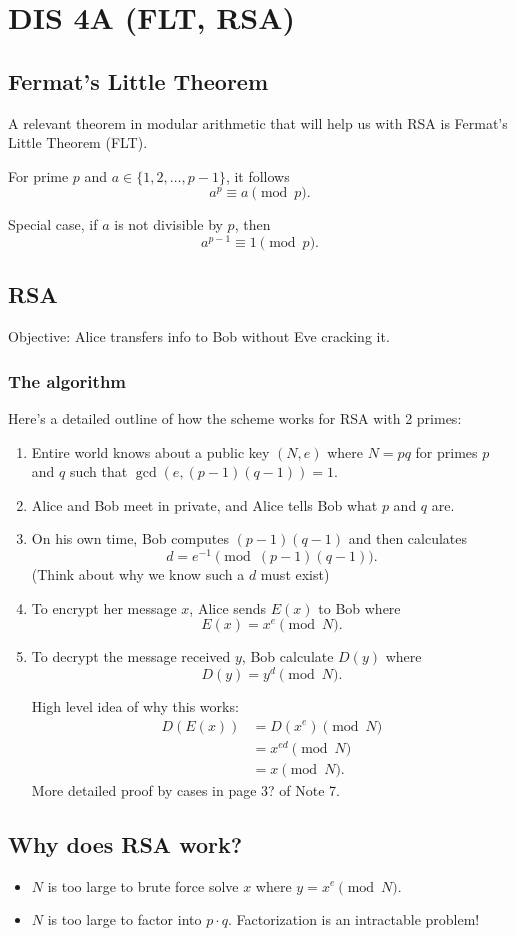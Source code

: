\section{DIS 4A (FLT, RSA)}

\subsection{Fermat's Little Theorem}

A relevant theorem in modular arithmetic that will help us with RSA is Fermat's Little Theorem (FLT).

\begin{theorem}
    For prime $p$ and $a \in \{1, 2, \ldots, p-1\}$, it follows \[ a^{p} \equiv a \pmod{p}. \]

    Special case, if $a$ is not divisible by $p$, then \[ a^{p-1} \equiv 1 \pmod{p}. \]
\end{theorem}

\subsection{RSA}
Objective: Alice transfers info to Bob without Eve cracking it. 
\subsubsection{The algorithm}
Here's a detailed outline of how the scheme works for RSA with 2 primes:
\begin{enumerate}
    \item Entire world knows about a public key $(N,e)$ where $N = pq$ for primes $p$ and $q$ such that $\gcd(e, (p-1)(q-1)) = 1.$
    \item Alice and Bob meet in private, and Alice tells Bob what $p$ and $q$ are.
    \item On his own time, Bob computes $(p-1)(q-1)$ and then calculates \[ d = e^{-1} \pmod{(p-1)(q-1)}. \] (Think about why we know such a $d$ must exist)
    \item To encrypt her message $x$, Alice sends $E(x)$ to Bob where \[ E(x) = x^{e} \pmod{N}. \]
    \item To decrypt the message received $y$, Bob calculate $D(y)$ where \[ D(y) = y^{d} \pmod{N}. \]
    
    High level idea of why this works: \begin{align*}
        D(E(x)) &= D(x^{e}) \pmod{N}\\
        &= x^{ed} \pmod{N} \\
        &= x \pmod{N}.
    \end{align*}
    More detailed proof by cases in page 3? of Note 7. 
\end{enumerate}

\subsection{Why does RSA work?}
\begin{itemize}
    \item $N$ is too large to brute force solve $x$ where $y = x^{e} \pmod{N}$. 
    \item $N$ is too large to factor into $p \cdot q$. Factorization is an intractable problem!
\end{itemize}